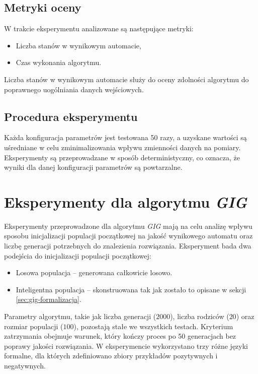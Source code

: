 \subsection{Metryki oceny}  
W trakcie eksperymentu analizowane są następujące metryki:  
\begin{itemize}  
    \item Liczba stanów w wynikowym automacie,  
    \item Czas wykonania algorytmu.  
\end{itemize}  

Liczba stanów w wynikowym automacie służy do oceny zdolności algorytmu do poprawnego uogólniania danych wejściowych.  

\subsection{Procedura eksperymentu}  
Każda konfiguracja parametrów jest testowana 50 razy, a uzyskane wartości są uśredniane w celu zminimalizowania wpływu zmienności danych na pomiary. Eksperymenty są przeprowadzane w sposób deterministyczny, co oznacza, że wyniki dla danej konfiguracji parametrów są powtarzalne.  


\section{Eksperymenty dla algorytmu \textit{GIG}} 
Eksperymenty przeprowadzone dla algorytmu \textit{GIG} mają na celu analizę wpływu sposobu inicjalizacji populacji początkowej na jakość wynikowego automatu oraz liczbę generacji potrzebnych do znalezienia rozwiązania. Eksperyment bada dwa podejścia do inicjalizacji populacji początkowej:  
\begin{itemize}  
    \item Losowa populacja – generowana całkowicie losowo.  
    \item Inteligentna populacja – skonstruowana tak jak zostało to opisane w sekcji \ref{sec:gig-formalizacja}.  
\end{itemize}  

Parametry algorytmu, takie jak liczba generacji (\(2000\)), liczba rodziców (\(20\)) oraz rozmiar populacji (\(100\)), pozostają stałe we wszystkich testach. Kryterium zatrzymania obejmuje warunek, który kończy proces po 50 generacjach bez poprawy jakości rozwiązania. W eksperymencie wykorzystano trzy różne języki formalne, dla których zdefiniowano zbiory przykładów pozytywnych i negatywnych. 

